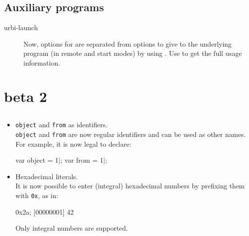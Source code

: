 \subsection{Auxiliary programs}

\begin{description}
\item[urbi-launch] Now, options for  are separated from
  options to give to the underlying program (in remote and start modes) by
  using \option{--}. Use  to get the full usage
  information.
\end{description}



\section{ beta 2}

\subsection{\us}

\begin{itemize}
\item \lstinline{object} and \lstinline{from} as identifiers.\\
  \lstinline{object} and \lstinline{from} are now regular identifiers and
  can be used as other names.  For example, it is now legal to declare:

\begin{urbiscript}
var object = 1|;
var from = 1|;
\end{urbiscript}

\item Hexadecimal literals.\\
  It is now possible to enter (integral) hexadecimal numbers by
  prefixing them with \lstinline{0x}, as in:

\begin{urbiscript}
0x2a;
[00000001] 42
\end{urbiscript}

  Only integral numbers are supported.

\end{itemize}

